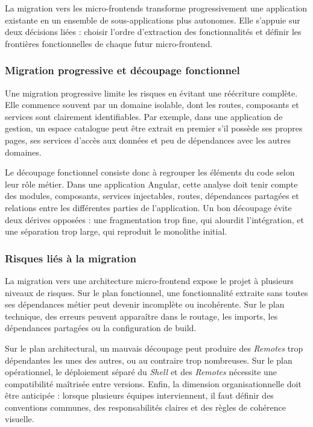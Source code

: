 La migration vers les micro-frontends transforme progressivement une application existante en un ensemble de sous-applications plus autonomes. Elle s'appuie sur deux décisions liées : choisir l'ordre d'extraction des fonctionnalités et définir les frontières fonctionnelles de chaque futur micro-frontend.

\subsubsection{Migration progressive et découpage fonctionnel}

Une migration progressive limite les risques en évitant une réécriture complète. Elle commence souvent par un domaine isolable, dont les routes, composants et services sont clairement identifiables. Par exemple, dans une application de gestion, un espace \og catalogue \fg{} peut être extrait en premier s'il possède ses propres pages, ses services d'accès aux données et peu de dépendances avec les autres domaines.

Le découpage fonctionnel consiste donc à regrouper les éléments du code selon leur rôle métier. Dans une application Angular, cette analyse doit tenir compte des modules, composants, services injectables, routes, dépendances partagées et relations entre les différentes parties de l'application. Un bon découpage évite deux dérives opposées : une fragmentation trop fine, qui alourdit l'intégration, et une séparation trop large, qui reproduit le monolithe initial.

\subsubsection{Risques liés à la migration}

La migration vers une architecture micro-frontend expose le projet à plusieurs niveaux de risques. Sur le plan fonctionnel, une fonctionnalité extraite sans toutes ses dépendances métier peut devenir incomplète ou incohérente. Sur le plan technique, des erreurs peuvent apparaître dans le routage, les imports, les dépendances partagées ou la configuration de build.

Sur le plan architectural, un mauvais découpage peut produire des \textit{Remotes} trop dépendantes les unes des autres, ou au contraire trop nombreuses. Sur le plan opérationnel, le déploiement séparé du \textit{Shell} et des \textit{Remotes} nécessite une compatibilité maîtrisée entre versions. Enfin, la dimension organisationnelle doit être anticipée : lorsque plusieurs équipes interviennent, il faut définir des conventions communes, des responsabilités claires et des règles de cohérence visuelle.

